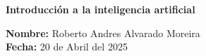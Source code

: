 \documentclass[a4paper,12pt]{article}
\begin{document}
\begin{center}
    \Large \textbf{Introducción a la inteligencia artificial}
\end{center}

\noindent\textbf{Nombre:} Roberto Andres Alvarado Moreira \\
\noindent\textbf{Fecha:} 20 de Abril del 2025\\

\newpage


\end{document}
